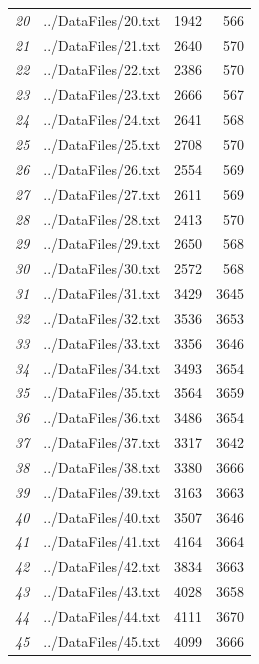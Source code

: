 \documentclass[12pt]{article}
\begin{document}
\begin{table}[ht]
{\begin{tabular}{rlrr}
									{\textit{20}} & ../DataFiles/20.txt & 1942 & 566 \\ 
									{\textit{21}} & ../DataFiles/21.txt & 2640 & 570 \\ 
									{\textit{22}} & ../DataFiles/22.txt & 2386 & 570 \\ 
									{\textit{23}} & ../DataFiles/23.txt & 2666 & 567 \\ 
									{\textit{24}} & ../DataFiles/24.txt & 2641 & 568 \\ 
									{\textit{25}} & ../DataFiles/25.txt & 2708 & 570 \\ 
									{\textit{26}} & ../DataFiles/26.txt & 2554 & 569 \\ 
									{\textit{27}} & ../DataFiles/27.txt & 2611 & 569 \\ 
									{\textit{28}} & ../DataFiles/28.txt & 2413 & 570 \\ 
									{\textit{29}} & ../DataFiles/29.txt & 2650 & 568 \\ 
									{\textit{30}} & ../DataFiles/30.txt & 2572 & 568 \\ 
									{\textit{31}} & ../DataFiles/31.txt & 3429 & 3645 \\ 
									{\textit{32}} & ../DataFiles/32.txt & 3536 & 3653 \\ 
									{\textit{33}} & ../DataFiles/33.txt & 3356 & 3646 \\ 
									{\textit{34}} & ../DataFiles/34.txt & 3493 & 3654 \\ 
									{\textit{35}} & ../DataFiles/35.txt & 3564 & 3659 \\ 
									{\textit{36}} & ../DataFiles/36.txt & 3486 & 3654 \\ 
									{\textit{37}} & ../DataFiles/37.txt & 3317 & 3642 \\ 
									{\textit{38}} & ../DataFiles/38.txt & 3380 & 3666 \\ 
									{\textit{39}} & ../DataFiles/39.txt & 3163 & 3663 \\ 
									{\textit{40}} & ../DataFiles/40.txt & 3507 & 3646 \\ 
									{\textit{41}} & ../DataFiles/41.txt & 4164 & 3664 \\ 
									{\textit{42}} & ../DataFiles/42.txt & 3834 & 3663 \\ 
									{\textit{43}} & ../DataFiles/43.txt & 4028 & 3658 \\ 
									{\textit{44}} & ../DataFiles/44.txt & 4111 & 3670 \\ 
									{\textit{45}} & ../DataFiles/45.txt & 4099 & 3666 \\ 
									\hline
								\end{tabular}
							}
					\end{table}
\end{document}
